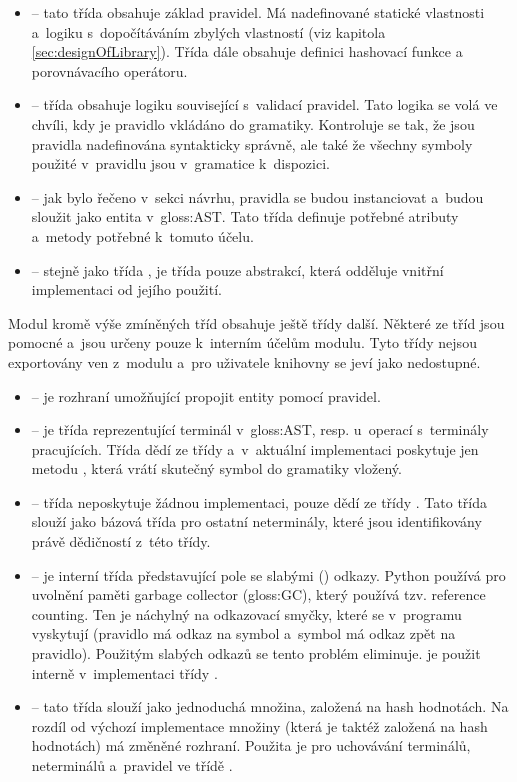 		\begin{itemize}
			\item {} -- tato třída obsahuje základ pravidel. Má nadefinované statické vlastnosti a~logiku s~dopočítáváním zbylých vlastností (viz kapitola \ref{sec:designOfLibrary}). Třída dále obsahuje definici hashovací funkce a porovnávacího operátoru.
			\item {} -- třída  obsahuje logiku související s~validací pravidel. Tato logika se volá ve chvíli, kdy je pravidlo vkládáno do gramatiky. Kontroluje se tak, že jsou pravidla nadefinována syntakticky správně, ale také že všechny symboly použité v~pravidlu jsou v~gramatice k~dispozici.
			\item {} -- jak bylo řečeno v~sekci návrhu, pravidla se budou instanciovat a~budou sloužit jako entita v~\gls{gloss:AST}. Tato třída definuje potřebné atributy a~metody potřebné k~tomuto účelu.
			\item {} -- stejně jako třída , je třída  pouze abstrakcí, která odděluje vnitřní implementaci od jejího použití. 
		\end{itemize}
	
		Modul kromě výše zmíněných tříd obsahuje ještě třídy další. Některé ze tříd jsou pomocné a~jsou určeny pouze k~interním účelům modulu. Tyto třídy nejsou exportovány ven z~modulu a~pro uživatele knihovny se jeví jako nedostupné.
		
		\begin{itemize}
			\item {} -- je rozhraní umožňující propojit entity pomocí pravidel. 
			\item {} -- je třída reprezentující terminál v~\gls{gloss:AST}, resp. u~operací s~terminály pracujících. Třída dědí ze třídy  a~v~aktuální implementaci poskytuje jen metodu , která vrátí skutečný symbol do gramatiky vložený.
			\item {} -- třída  neposkytuje žádnou implementaci, pouze dědí ze třídy . Tato třída slouží jako bázová třída pro ostatní neterminály, které jsou identifikovány právě dědičností z~této třídy.
			\item {} -- je interní třída představující pole se slabými () odkazy. Python používá pro uvolnění paměti garbage collector (\gls{gloss:GC}), který používá tzv. reference counting. Ten je náchylný na odkazovací smyčky, které se v~programu vyskytují (pravidlo má odkaz na symbol a~symbol má odkaz zpět na pravidlo). Použitým slabých odkazů se tento problém eliminuje.  je použit interně v~implementaci třídy .
			\item {} -- tato třída slouží jako jednoduchá množina, založená na hash hodnotách. Na rozdíl od výchozí implementace množiny (která je taktéž založená na hash hodnotách) má  změněné rozhraní. Použita je pro uchovávání terminálů, neterminálů a~pravidel ve třídě .
		\end{itemize}
	
